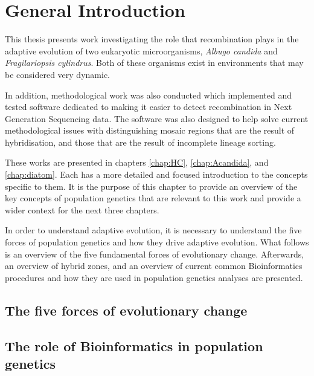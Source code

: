 \chapter{General Introduction}

\label{chap:Intro}

This thesis presents work investigating the role that recombination plays in the adaptive evolution of two eukaryotic microorganisms, \textit{Albugo candida} and \textit{Fragilariopsis cylindrus}.
Both of these organisms exist in environments that may be considered very dynamic.

In addition, methodological work was also conducted which implemented and tested software dedicated to making it easier to detect recombination in Next Generation Sequencing data. 
The software was also designed to help solve current methodological issues with distinguishing mosaic regions that are the result of hybridisation, and those that are the result of incomplete lineage sorting.

These works are presented in chapters \ref{chap:HC}, \ref{chap:Acandida}, and \ref{chap:diatom}. Each has a more detailed and focused introduction to the concepts specific to them.
It is the purpose of this chapter to provide an overview of the key concepts of population genetics that are relevant to this work and provide a wider context for the next three chapters.

In order to understand adaptive evolution, it is necessary to understand the five forces of population genetics and how they drive adaptive evolution.
What follows is an overview of the five fundamental forces of evolutionary change. Afterwards, an overview of hybrid zones, and an overview of current common Bioinformatics procedures and how they are used in population genetics analyses are presented.   

\section{The five forces of evolutionary change}









\section{The role of Bioinformatics in population genetics}


